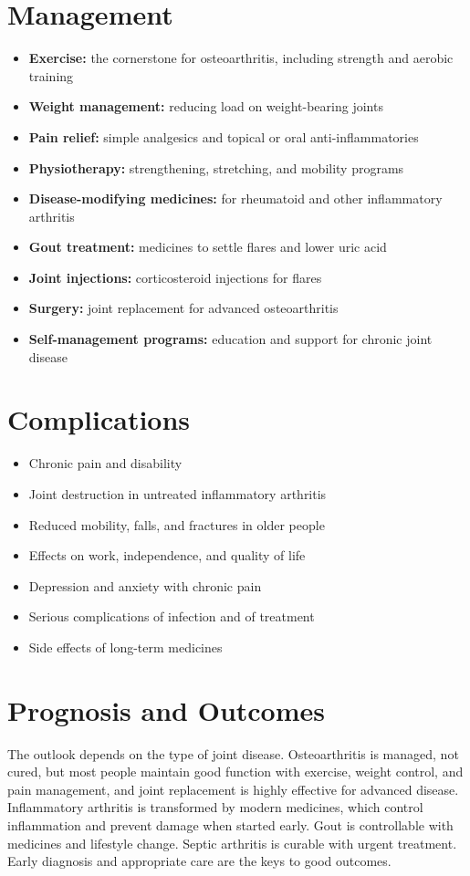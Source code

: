 \section*{Management}
\begin{itemize}
    \item \textbf{Exercise:} the cornerstone for osteoarthritis, including strength and aerobic training
    \item \textbf{Weight management:} reducing load on weight-bearing joints
    \item \textbf{Pain relief:} simple analgesics and topical or oral anti-inflammatories
    \item \textbf{Physiotherapy:} strengthening, stretching, and mobility programs
    \item \textbf{Disease-modifying medicines:} for rheumatoid and other inflammatory arthritis
    \item \textbf{Gout treatment:} medicines to settle flares and lower uric acid
    \item \textbf{Joint injections:} corticosteroid injections for flares
    \item \textbf{Surgery:} joint replacement for advanced osteoarthritis
    \item \textbf{Self-management programs:} education and support for chronic joint disease
\end{itemize}

\section*{Complications}
\begin{itemize}
    \item Chronic pain and disability
    \item Joint destruction in untreated inflammatory arthritis
    \item Reduced mobility, falls, and fractures in older people
    \item Effects on work, independence, and quality of life
    \item Depression and anxiety with chronic pain
    \item Serious complications of infection and of treatment
    \item Side effects of long-term medicines
\end{itemize}

\section*{Prognosis and Outcomes}
The outlook depends on the type of joint disease. Osteoarthritis is managed, not cured, but most people maintain good function with exercise, weight control, and pain management, and joint replacement is highly effective for advanced disease. Inflammatory arthritis is transformed by modern medicines, which control inflammation and prevent damage when started early. Gout is controllable with medicines and lifestyle change. Septic arthritis is curable with urgent treatment. Early diagnosis and appropriate care are the keys to good outcomes.

